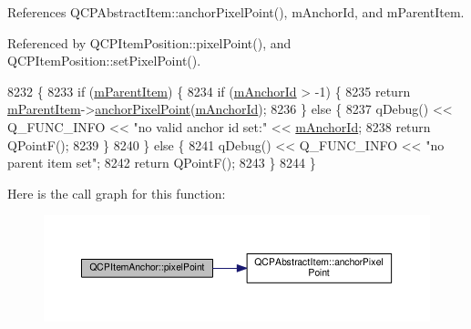 References Q\+C\+P\+Abstract\+Item\+::anchor\+Pixel\+Point(), m\+Anchor\+Id, and m\+Parent\+Item.



Referenced by Q\+C\+P\+Item\+Position\+::pixel\+Point(), and Q\+C\+P\+Item\+Position\+::set\+Pixel\+Point().


\begin{DoxyCode}
8232                                         \{
8233   \textcolor{keywordflow}{if} (\hyperlink{class_q_c_p_item_anchor_a80fad480ad3bb980446ed6ebc00818ae}{mParentItem}) \{
8234     \textcolor{keywordflow}{if} (\hyperlink{class_q_c_p_item_anchor_a00c62070333e8345976b579676ad3997}{mAnchorId} > -1) \{
8235       \textcolor{keywordflow}{return} \hyperlink{class_q_c_p_item_anchor_a80fad480ad3bb980446ed6ebc00818ae}{mParentItem}->\hyperlink{class_q_c_p_abstract_item_a94bde62b8a2fc133666dcbb8035deeed}{anchorPixelPoint}(\hyperlink{class_q_c_p_item_anchor_a00c62070333e8345976b579676ad3997}{mAnchorId});
8236     \} \textcolor{keywordflow}{else} \{
8237       qDebug() << Q\_FUNC\_INFO << \textcolor{stringliteral}{"no valid anchor id set:"} << \hyperlink{class_q_c_p_item_anchor_a00c62070333e8345976b579676ad3997}{mAnchorId};
8238       \textcolor{keywordflow}{return} QPointF();
8239     \}
8240   \} \textcolor{keywordflow}{else} \{
8241     qDebug() << Q\_FUNC\_INFO << \textcolor{stringliteral}{"no parent item set"};
8242     \textcolor{keywordflow}{return} QPointF();
8243   \}
8244 \}
\end{DoxyCode}


Here is the call graph for this function\+:\nopagebreak
\begin{figure}[H]
\begin{center}
\leavevmode
\includegraphics[width=350pt]{class_q_c_p_item_anchor_ae92def8f9297c5d73f5806c586517bb3_cgraph}
\end{center}
\end{figure}




